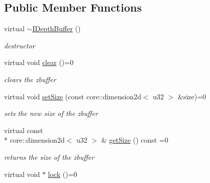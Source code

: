 \subsection*{Public Member Functions}
\begin{DoxyCompactItemize}
\item 
\hypertarget{classirr_1_1video_1_1_i_depth_buffer_a2303418d78bc2f1b6232a24ce80ff5ce}{virtual \hyperlink{classirr_1_1video_1_1_i_depth_buffer_a2303418d78bc2f1b6232a24ce80ff5ce}{$\sim$\-I\-Depth\-Buffer} ()}\label{classirr_1_1video_1_1_i_depth_buffer_a2303418d78bc2f1b6232a24ce80ff5ce}

\begin{DoxyCompactList}\small\item\em destructor \end{DoxyCompactList}\item 
\hypertarget{classirr_1_1video_1_1_i_depth_buffer_a07fb76d0760c87488ffcd70fe56071a7}{virtual void \hyperlink{classirr_1_1video_1_1_i_depth_buffer_a07fb76d0760c87488ffcd70fe56071a7}{clear} ()=0}\label{classirr_1_1video_1_1_i_depth_buffer_a07fb76d0760c87488ffcd70fe56071a7}

\begin{DoxyCompactList}\small\item\em clears the zbuffer \end{DoxyCompactList}\item 
\hypertarget{classirr_1_1video_1_1_i_depth_buffer_ab9860f3f533d75f3dcbe270634505393}{virtual void \hyperlink{classirr_1_1video_1_1_i_depth_buffer_ab9860f3f533d75f3dcbe270634505393}{set\-Size} (const core\-::dimension2d$<$ u32 $>$ \&size)=0}\label{classirr_1_1video_1_1_i_depth_buffer_ab9860f3f533d75f3dcbe270634505393}

\begin{DoxyCompactList}\small\item\em sets the new size of the zbuffer \end{DoxyCompactList}\item 
\hypertarget{classirr_1_1video_1_1_i_depth_buffer_aa130bb5f627751d52102e09ea3a8180e}{virtual const \\*
core\-::dimension2d$<$ u32 $>$ \& \hyperlink{classirr_1_1video_1_1_i_depth_buffer_aa130bb5f627751d52102e09ea3a8180e}{get\-Size} () const =0}\label{classirr_1_1video_1_1_i_depth_buffer_aa130bb5f627751d52102e09ea3a8180e}

\begin{DoxyCompactList}\small\item\em returns the size of the zbuffer \end{DoxyCompactList}\item 
\hypertarget{classirr_1_1video_1_1_i_depth_buffer_a925063fdaae6b07e1d6df94f2681ff48}{virtual void $\ast$ \hyperlink{classirr_1_1video_1_1_i_depth_buffer_a925063fdaae6b07e1d6df94f2681ff48}{lock} ()=0}\label{classirr_1_1video_1_1_i_depth_buffer_a925063fdaae6b07e1d6df94f2681ff48}


\end{DoxyCompactItemize}

